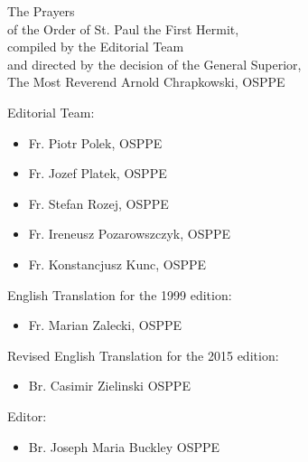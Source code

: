 \hspace{0pt}
\pagebreak

\begin{center}
The Prayers \\ of the Order of St. Paul the First Hermit,\\
compiled by the Editorial Team \\ and directed by the decision
of the General Superior,\\ The Most Reverend Arnold Chrapkowski, OSPPE
\end{center}

\vspace{4em}

Editorial Team:
\begin{itemize}
\item Fr. Piotr Polek, OSPPE
\item Fr. Jozef Platek, OSPPE
\item Fr. Stefan Rozej, OSPPE
\item Fr. Ireneusz Pozarowszczyk, OSPPE
\item Fr. Konstancjusz Kunc, OSPPE
\end{itemize}
\medbreak

English Translation for the 1999 edition:
\begin{itemize}
\item Fr. Marian Zalecki, OSPPE
\end{itemize}
\medbreak

Revised English Translation for the 2015 edition:
\begin{itemize}
\item Br. Casimir Zielinski OSPPE
\end{itemize}
\medbreak

Editor:
\begin{itemize}
\item Br. Joseph Maria Buckley OSPPE
\end{itemize}

\vfill

\pagebreak
